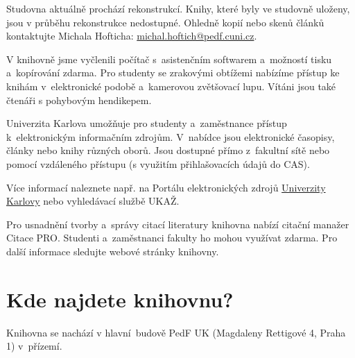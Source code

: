 Studovna aktuálně prochází rekonstrukcí. 
Knihy, které byly ve studovně uloženy, jsou v průběhu rekonstrukce nedostupné. Ohledně kopií nebo skenů článků kontaktujte Michala Hofticha: \url{michal.hoftich@pedf.cuni.cz}.


V knihovně jsme vyčlenili počítač s~asistenčním softwarem
a~možností tisku a~kopírování zdarma. Pro studenty se zrakovými obtížemi
nabízíme přístup ke knihám v~elektronické podobě a~kamerovou
zvětšovací lupu. 
Vítáni jsou také čtenáři s pohybovým hendikepem.  


Univerzita Karlova umožňuje pro studenty a~zaměstnance přístup
k~elektronickým informačním zdrojům. V~nabídce jsou elektronické
časopisy, články nebo knihy různých oborů. Jsou dostupné přímo
z~fakultní sítě nebo pomocí vzdáleného přístupu (s využitím
přihlašovacích údajů do CAS).

Více informací naleznete např. na Portálu elektronických zdrojů
{\href{http://pez.cuni.cz}{Univerzity Karlovy}} nebo vyhledávací
službě UKAŽ.


Pro usnadnění tvorby a~správy citací literatury knihovna nabízí citační
manažer Citace PRO. Studenti a~zaměstnanci fakulty ho mohou využívat
zdarma. Pro další informace sledujte webové stránky knihovny.

\newpage
\section{Kde najdete knihovnu?}

Knihovna se nachází v hlavní~budově PedF UK (Magdaleny Rettigové 4,
Praha 1) v~přízemí.



